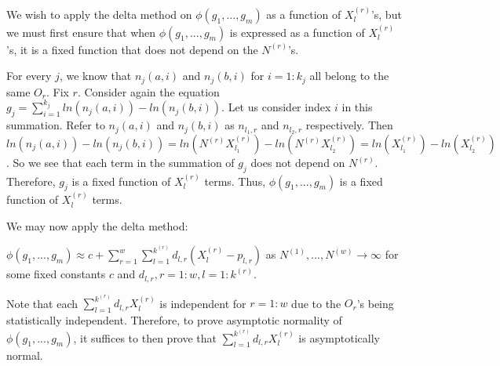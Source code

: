 \documentclass{article}
\begin{document}
We wish to apply the delta method on $\displaystyle \phi \left( g_{1} ,...,g_{m}\right)$ as a function of $\displaystyle X_{l}^{\left( r\right)}$'s, but we must first ensure that when $\displaystyle \phi \left( g_{1} ,...,g_{m}\right)$ is expressed as a function of $\displaystyle X_{l}^{\left( r\right)}$'s, it is a fixed function that does not depend on the $\displaystyle N^{\left( r\right)}$'s.



For every $\displaystyle j$, we know that $\displaystyle n_{j}\left( a,i\right)$ and $\displaystyle n_{j}\left( b,i\right)$ for $\displaystyle i=1:k_{j}$ all belong to the same $\displaystyle O_{r}$. Fix $\displaystyle r$. Consider again the equation $\displaystyle g_{j} =\sum _{i=1}^{k_{j}} ln\left( n_{j}\left( a,i\right)\right) -ln\left( n_{j}\left( b,i\right)\right)$. Let us consider index $\displaystyle i$ in this summation. Refer to $\displaystyle n_{j}\left( a,i\right)$ and $\displaystyle n_{j}\left( b,i\right)$ as $\displaystyle n_{l_{1} ,r}$ and $\displaystyle n_{l_{2} ,r}$ respectively. Then $\displaystyle ln\left( n_{j}\left( a,i\right)\right) -ln\left( n_{j}\left( b,i\right)\right) =ln\left( N^{\left( r\right)} X_{l_{1}}^{\left( r\right)}\right) -ln\left( N^{\left( r\right)} X_{l_{2}}^{\left( r\right)}\right) =ln\left( X_{l_{1}}^{\left( r\right)}\right) -ln\left( X_{l_{2}}^{\left( r\right)}\right)$. So we see that each term in the summation of $\displaystyle g_{j}$ does not depend on $\displaystyle N^{\left( r\right)}$. Therefore, $\displaystyle g_{j}$ is a fixed function of $\displaystyle X_{l}^{\left( r\right)}$ terms. Thus, $\displaystyle \phi \left( g_{1} ,...,g_{m}\right)$ is a fixed function of $\displaystyle X_{l}^{\left( r\right)}$ terms.



We may now apply the delta method:

$\displaystyle \phi \left( g_{1} ,...,g_{m}\right) \approx c+\sum _{r=1}^{w}\sum _{l=1}^{k^{\left( r\right)}} d_{l,r}\left( X_{l}^{\left( r\right)} -p_{l,r}\right)$ as $\displaystyle N^{\left( 1\right)} ,...,N^{\left( w\right)}\rightarrow \infty $ for some fixed constants $\displaystyle c$ and $\displaystyle d_{l,r} ,r=1:w,l=1:k^{\left( r\right)}$.



Note that each $\displaystyle \sum _{l=1}^{k^{\left( r\right)}} d_{l,r} X_{l}^{\left( r\right)}$ is independent for $\displaystyle r=1:w$ due to the $\displaystyle O_{r}$'s being statistically independent. Therefore, to prove asymptotic normality of $\displaystyle \phi \left( g_{1} ,...,g_{m}\right)$, it suffices to then prove that $\displaystyle \sum _{l=1}^{k^{\left( r\right)}} d_{l,r} X_{l}^{\left( r\right)}$ is asymptotically normal.
\end{document}
